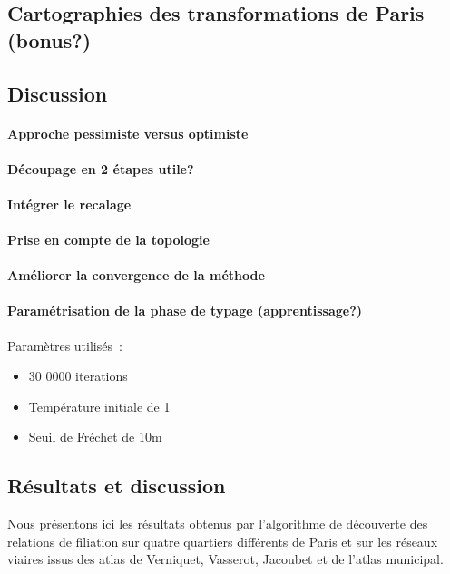 \documentclass[a4paper,12pt]{article}
\begin{document}
\subsection{Cartographies des transformations de Paris (bonus?)}

\subsection{Discussion}
\paragraph{Approche pessimiste versus optimiste}
\paragraph{Découpage en 2 étapes utile?}
\paragraph{Intégrer le recalage}
\paragraph{Prise en compte de la topologie}
\paragraph{Améliorer la convergence de la méthode}
\paragraph{Paramétrisation de la phase de typage (apprentissage?)}


Paramètres utilisés~:
\begin{itemize}
\item 30 0000 iterations
\item Température initiale de 1
\item Seuil de Fréchet de 10m
\end{itemize}



\subsection{Résultats et discussion}
Nous présentons ici les résultats obtenus par l'algorithme de découverte des relations de filiation sur quatre quartiers différents de Paris et sur les réseaux viaires issus des atlas de Verniquet, Vasserot, Jacoubet et de l'atlas municipal. 
\end{document}
